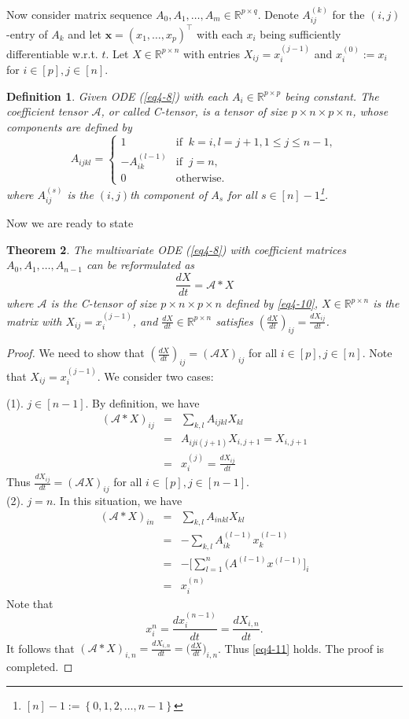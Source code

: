 \documentclass[11pt, oneside]{article}  %
\newtheorem{thm}{Theorem}[section]
\newtheorem{definition}[thm]{Definition}
\newcommand{\set}[1]{\left\{#1\right\}}
\newcommand{\RR}{\mathbb{R}}
\newcommand{\A}{\mathcal{A}}
\newcommand{\bx}{\textbf{x}}
\newcommand{\beq}{\begin{equation}}
\newcommand{\eeq}{\end{equation}}
\newcommand{\beyy}{\begin{eqnarray*}}
\newcommand{\eeyy}{\end{eqnarray*}}
\begin{document}
Now consider matrix sequence $A_0,A_1, \ldots,A_m\in\RR^{p\times q}$. Denote $A_{ij}^{(k)}$ for the $(i,j)$-entry of $A_k$ and let 
$\bx=(x_1,\ldots, x_p)^{\top}$ with each $x_i$ being sufficiently differentiable w.r.t. $t$.  Let $X\in\RR^{p\times n}$ with entries 
$X_{ij}=x_{i}^{(j-1)}$ and $x_{i}^{(0)}:= x_{i}$ for $i\in [p], j\in [n]$.    
\begin{definition}\label{def4-3}
Given ODE (\ref{eq4-8}) with each $A_{i}\in\RR^{p\times p}$ being constant.  The \emph{coefficient tensor} $\A$, or called \emph{C-tensor}, 
is a tensor of size $p\times n\times p\times n$, whose components are defined by   
 \beq\label{eq4-10} 
 A_{ijkl}= \begin{cases}  
   1 & \text{if }\  k=i, l=j+1, 1\le j\le n-1, \\
   -A^{(l-1)}_{ik} & \text{if }\  j=n, \\    
   0 & \text{otherwise}. 
 \end{cases}  
 \eeq
 where $A^{(s)}_{ij}$ is the $(i,j)$th component of $A_{s}$ for all $s\in [n]-1$\footnote{ $[n]-1:=\set{0,1,2,\ldots,n-1 }$}. 
\end{definition}

Now we are ready to state  
\begin{thm}\label{th4-2}
The multivariate ODE (\ref{eq4-8}) with coefficient matrices $A_{0},A_{1},\ldots, A_{n-1}$ can be reformulated as 
\beq\label{eq4-11}  
\frac{d X}{dt} = \A\ast X  
\eeq
where $\A$ is the C-tensor of size $p\times n\times p\times n$ defined by \eqref{eq4-10}, $X\in\RR^{p\times n}$ is the matrix with 
$X_{ij} = x_{i}^{(j-1)}$, and $\frac{dX}{dt}\in\RR^{p\times n}$ satisfies $(\frac{dX}{dt})_{ij}=\frac{d X_{ij}}{dt}$. 
\end{thm}

\begin{proof}
We need to show that $(\frac{dX}{dt})_{ij}=(\A X)_{ij}$ for all $i\in [p], j\in [n]$.  Note that 
$X_{ij} =x_{i}^{(j-1)}$.  We consider two cases: \par 
\indent (1).  $j\in [n-1]$. By definition, we have 
\beyy  
(\A\ast X)_{ij} &=& \sum\limits_{k,l} A_{ijkl}X_{kl} \\
                    &=& A_{iji(j+1)} X_{i,j+1} =X_{i,j+1}\\
                    &=& x_{i}^{(j)} =\frac{d X_{ij}}{dt}  
\eeyy  
Thus $\frac{d X_{ij}}{dt}= (\A X)_{ij} $ for all $i\in [p], j\in [n-1]$. \\
\indent (2).  $j=n$.  In this situation, we have 
\beyy  
(\A\ast X)_{i n} &=& \sum\limits_{k,l} A_{i n k l}X_{k l} \\
             &=& -\sum\limits_{k,l} A_{ik}^{(l-1)} x_{k}^{(l-1)}\\
             &=& -\bigl[\sum_{l=1}^{n} \bigl(A^{(l-1)}x^{(l-1)}\bigr]_{i}\\
             &=& x_{i}^{(n)}  
\eeyy  
Note that 
\[
x_{i}^{n} = \frac{d\!x_{i}^{(n-1)}}{d\!t} = \frac{d\!X_{i,n}}{d\!t}. \]
It follows that  $(\A\ast X)_{i,n} = \frac{d\!X_{i,n}}{d\!t} = \bigl(\frac{d\!X}{d\!t}\bigr)_{i,n}$.  Thus \eqref{eq4-11} holds.   
The proof is completed.   
\end{proof}
\end{document}
